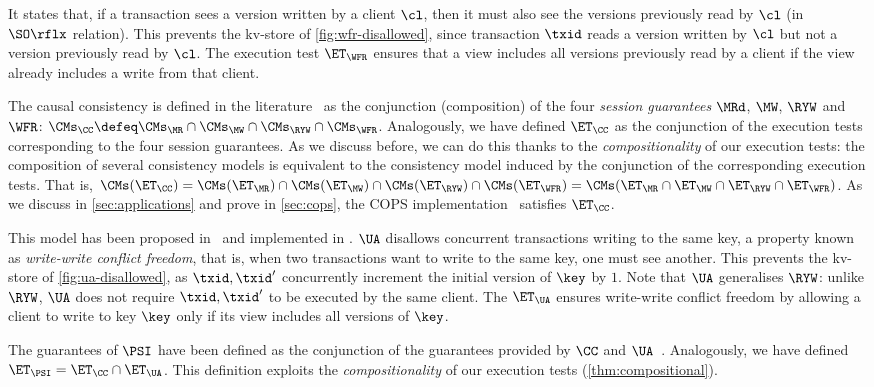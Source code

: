 

It states that, if a transaction sees a version written by a
client $\cl$, then it must also see the versions previously read by $\cl$ (in $\SO\rflx$ relation).
This prevents the kv-store of \cref{fig:wfr-disallowed},
since transaction $\txid$ reads a version written by $\cl$ but
not a version previously read by $\cl$.
The execution test $\ET_{\WFR}$ ensures
that a view includes all versions previously read by a client 
if the view already includes a write from that client. 

The causal consistency is defined in the literature~\cite{session2causal} 
as the conjunction (composition) of the four \emph{session guarantees} \(\MRd\), \(\MW\), \(\RYW\) and \(\WFR\):   
$\CMs_{\CC} \defeq \CMs_{\MR} \cap \CMs_{\MW} \cap \CMs_{\RYW} \cap \CMs_{\WFR}$. 
Analogously, we have defined $\ET_\CC$ as the conjunction of the execution tests corresponding to the four session guarantees.
As we discuss before, we can do this thanks to the \emph{compositionality} of our execution tests:
the composition of several consistency models is equivalent to the consistency model induced by the conjunction of the corresponding execution tests. 
That is, $\CMs(\ET_\CC) = \CMs(\ET_{\MR}) \cap \CMs(\ET_{\MW}) \cap
\CMs(\ET_{\RYW}) \cap \CMs(\ET_{\WFR}) = \CMs(\ET_{\MR} \cap
\ET_{\MW} \cap \ET_{\RYW} \cap \ET_{\WFR})$.
As we discuss in \cref{sec:applications} and prove in \ref{sec:cops}, the COPS
implementation~\cite{cops} satisfies $\ET_{\CC}$. 

This model has been proposed in~\cite{framework-concur} 
and implemented in \cite{rola}.
$\UA$ disallows concurrent transactions writing to the same key,
a property known as \emph{write-write conflict freedom}, that is, 
when two transactions want to write to the same key, one must see another.
This prevents the kv-store of \cref{fig:ua-disallowed},
as $\txid, \txid'$ concurrently increment the initial version of $\key$ by $1$.
Note that $\UA$ generalises $\RYW$: unlike $\RYW$, $\UA$ does not require $\txid, \txid'$ to be executed by the same client.
The $\ET_\UA$ ensures write-write conflict freedom by allowing a client to write to key $\key$
only if its view includes all versions of $\key$.

The guarantees of $\PSI$ have been defined as the conjunction of the guarantees provided by $\CC$ and $\UA$~\cite{framework-concur}.
Analogously, we have defined $\ET_\PSI = \ET_\CC \cap \ET_\UA$. 
This definition exploits the \emph{compositionality} of our execution tests (\cref{thm:compositional}).

